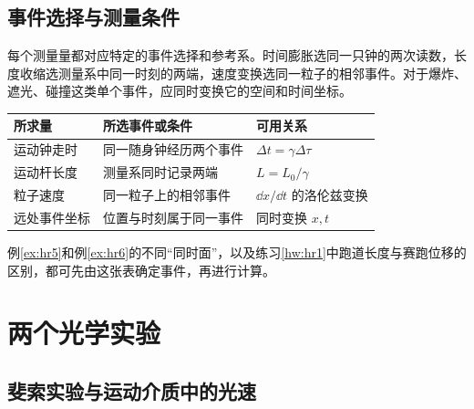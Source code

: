 

\subsection{事件选择与测量条件}

每个测量量都对应特定的事件选择和参考系。时间膨胀选同一只钟的两次读数，长度收缩选测量系中同一时刻的两端，速度变换选同一粒子的相邻事件。对于爆炸、遮光、碰撞这类单个事件，应同时变换它的空间和时间坐标。
\begin{center}\small
\begin{tabular}{p{}p{}p{}}
\toprule
所求量&所选事件或条件&可用关系\\\midrule
运动钟走时&同一随身钟经历两个事件&$\Delta t=\gamma\Delta\tau$\\
运动杆长度&测量系同时记录两端&$L=L_0/\gamma$\\
粒子速度&同一粒子上的相邻事件&$\dd x/\dd t$ 的洛伦兹变换\\
远处事件坐标&位置与时刻属于同一事件&同时变换 $x,t$\\
\bottomrule
\end{tabular}
\end{center}
例\ref{ex:hr5}和例\ref{ex:hr6}的不同“同时面”，以及练习\ref{hw:hr1}中跑道长度与赛跑位移的区别，都可先由这张表确定事件，再进行计算。

\section{两个光学实验}

\subsection{斐索实验与运动介质中的光速}

